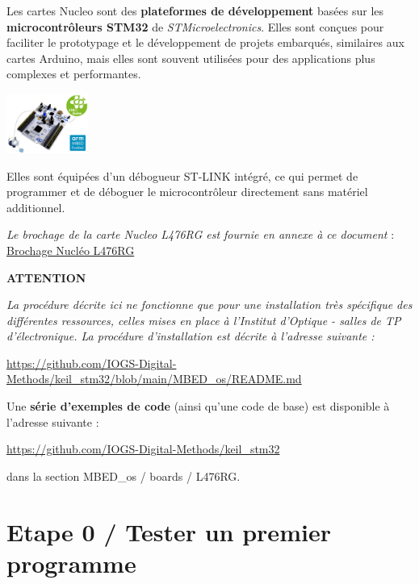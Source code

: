 \documentclass[a4paper,11pt,titlepage]{article} %
\begin{document}
Les cartes Nucleo sont des \textbf{plateformes de développement} basées sur les \textbf{microcontrôleurs STM32} de \textit{STMicroelectronics}. Elles sont conçues pour faciliter le prototypage et le développement de projets embarqués, similaires aux cartes Arduino, mais elles sont souvent utilisées pour des applications plus complexes et performantes.


\begin{center}
	\includegraphics[width=0.2\textwidth]{images/nucleo_board.jpg}
\end{center}

Elles sont équipées d'un débogueur ST-LINK intégré, ce qui permet de programmer et de déboguer le microcontrôleur directement sans matériel additionnel.

\textsl{Le brochage de la carte Nucleo L476RG est fournie en annexe à ce document} : \hyperref[doc:nucleo_pins_476RG]{Brochage Nucléo L476RG}


\cleardoublepage


{\large \textbf{ATTENTION}} 

\textit{La procédure décrite ici ne fonctionne que pour une installation très spécifique des différentes ressources, celles mises en place à l'Institut d'Optique - salles de TP d'électronique. La procédure d'installation est décrite à l'adresse suivante : }

\href{https://github.com/IOGS-Digital-Methods/keil_stm32/blob/main/MBED_os/README.md}{https://github.com/IOGS-Digital-Methods/keil\_stm32/blob/main/MBED\_os/README.md}

\bigskip


Une \textbf{série d'exemples de code} (ainsi qu'une code de base) est disponible à l'adresse suivante : 

\href{https://github.com/IOGS-Digital-Methods/keil_stm32}{https://github.com/IOGS-Digital-Methods/keil\_stm32}

dans la section MBED\_os / boards / L476RG.

\section{Etape 0 / Tester un premier programme}
\end{document}
